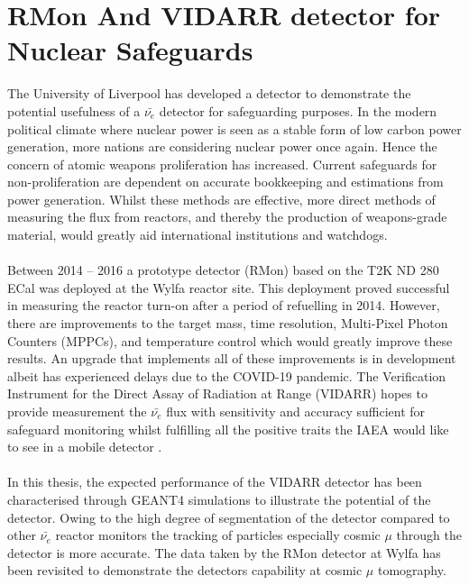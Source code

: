\section{RMon And VIDARR detector for Nuclear Safeguards}
The University of Liverpool has developed a detector to demonstrate the potential usefulness of a $\bar{\nu_e}$ detector for safeguarding purposes. In the modern political climate where nuclear power is seen as a stable form of low carbon power generation, more nations are considering nuclear power once again. Hence the concern of atomic weapons proliferation has increased. Current safeguards for non-proliferation are dependent on accurate bookkeeping and estimations from power generation. Whilst these methods are effective, more direct methods of measuring the flux from reactors, and thereby the production of weapons-grade material, would greatly aid international institutions and watchdogs.
\\\\Between 2014 -- 2016 a prototype detector (RMon) based on the T2K ND 280 ECal \cite{Allan_2013} was deployed at the Wylfa reactor site. This deployment proved successful in measuring the reactor turn-on after a period of refuelling in 2014. However, there are improvements to the target mass, time resolution, Multi-Pixel Photon Counters (MPPCs), and temperature control which would greatly improve these results. An upgrade that implements all of these improvements is in development albeit has experienced delays due to the COVID-19 pandemic. The Verification Instrument for the Direct Assay of Radiation at Range (VIDARR) hopes to provide measurement the $\bar{\nu_e}$ flux with sensitivity and accuracy sufficient for safeguard monitoring whilst fulfilling all the positive traits the IAEA would like to see in a mobile detector \cite{IAEA_2008}.
\\\\In this thesis, the expected performance of the VIDARR detector has been characterised through GEANT4 \cite{Agostinelli:2002hh} simulations to illustrate the potential of the detector. Owing to the high degree of segmentation of the detector compared to other $\bar{\nu_e}$ reactor monitors the tracking of particles especially cosmic $\mu$ through the detector is more accurate. The data taken by the RMon detector at Wylfa has been revisited to demonstrate the detectors capability at cosmic $\mu$ tomography.

